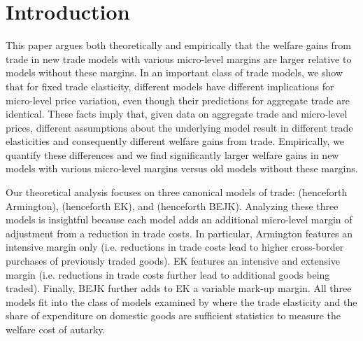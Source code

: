 \documentclass[12pt,dvips, ps2pdf]{article}
\begin{document}
\begin{onehalfspacing}



\thispagestyle{empty}
\end{onehalfspacing}

\newpage
\setcounter{page}{1}
\normalsize



\section{Introduction}

This paper argues both theoretically and empirically that the welfare gains from trade in new trade models with various micro-level margins are larger relative to models without these margins. In an important class of trade models, we show that for fixed trade elasticity, different models have different implications for micro-level price variation, even though their predictions for aggregate trade are identical. These facts imply that, given data on aggregate trade and micro-level prices, different assumptions about the underlying model result in different trade elasticities and consequently different welfare gains from trade. Empirically, we quantify these differences and we find significantly larger welfare gains in new models with various micro-level margins versus old models without these margins.

Our theoretical analysis focuses on three canonical models of trade: \citet{and79} (henceforth Armington), \citet{ek02} (henceforth EK), and \citet{bejk03} (henceforth BEJK). Analyzing these three models is insightful because each model adds an additional micro-level margin of adjustment from a reduction in trade costs. In particular, Armington features an intensive margin only (i.e. reductions in trade costs lead to higher cross-border purchases of previously traded goods). EK features an intensive and extensive margin (i.e. reductions in trade costs further lead to additional goods being traded). Finally, BEJK further adds to EK a variable mark-up margin. All three models fit into the class of models examined by \citet{acr09} where the trade elasticity and the share of expenditure on domestic goods are sufficient statistics to measure the welfare cost of autarky.
\end{document}

